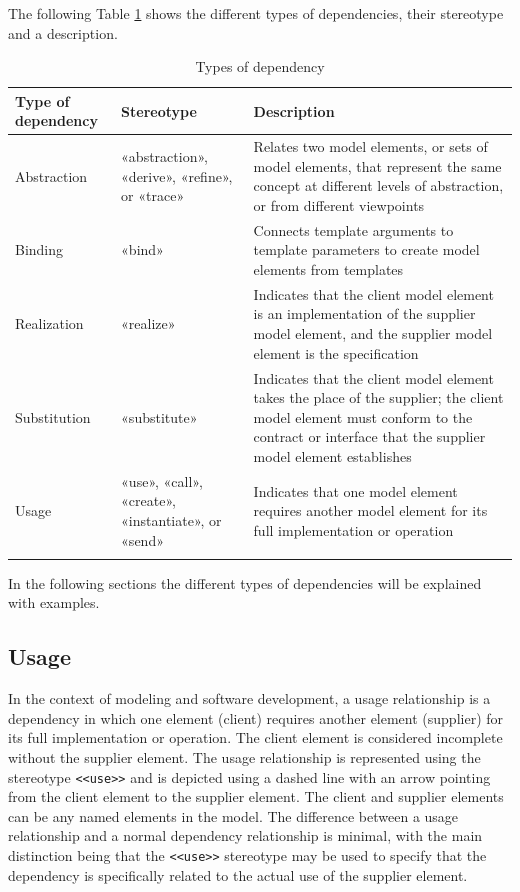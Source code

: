 \documentclass[
	12pt,
    a4paper,
    egregdoesnotlikesansseriftitles, %
    toc=chapterentrywithdots,
    oneside, openany,
    titlepage,
    parskip=half,
    headings=normal,  %
    listof=totoc,
    bibliography=totoc,
    index=totoc,
    captions=tableheading,  %
    listof=flat,
    numbers=noenddot, %
    final]
    {scrbook}
\begin{document}
The following Table \ref{tab:dependencies} shows the different types of dependencies, their stereotype and a description.

\vspace{1em}
{\RaggedRight
\begin{longtable} {|p{3.5cm}|p{3.25cm}|p{6.5cm}|}
		\hline
		\textbf{Type of dependency} & \textbf{Stereotype} & \textbf{Description} \\
		\hline
		Abstraction & «abstraction», «derive», «refine», or «trace» & Relates two model elements, or sets of model elements, that represent the same concept at different levels of abstraction, or from different viewpoints  \\ 
		\hline
		Binding & 	«bind» & Connects template arguments to template parameters to create model elements from templates \\ 
		\hline
		Realization & «realize» & 	Indicates that the client model element is an implementation of the supplier model element, and the supplier model element is the specification \\ 
		\hline
		Substitution & «substitute» & Indicates that the client model element takes the place of the supplier; the client model element must conform to the contract or interface that the supplier model element establishes  \\ 
		\hline
		Usage & «use», «call», «create», «instantiate», or «send» & Indicates that one model element requires another model element for its full implementation or operation  \\ 
		\hline
	\caption[Types of dependencies]{Types of dependency \cite{ibm_dependencies}}
	\label{tab:dependencies}
\end{longtable}
}

In the following sections the different types of dependencies will be explained with examples.

\subsection{Usage}
In the context of modeling and software development, a usage relationship is a dependency in which one element (client) requires another element (supplier) for its full implementation or operation. 
The client element is considered incomplete without the supplier element. 
The usage relationship is represented using the stereotype \texttt{<<use>>} and is depicted using a dashed line with an arrow pointing from the client element to the supplier element. 
The client and supplier elements can be any named elements in the model. 
The difference between a usage relationship and a normal dependency relationship is minimal, with the main distinction being that the \texttt{<<use>>} stereotype may be used to specify that the dependency is specifically related to the actual use of the supplier element. \cite[p. 161]{uml}
\end{document}
